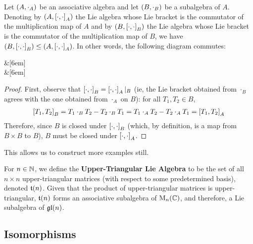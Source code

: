 \begin{boxproposition}\label{Ch1:Prop:Subalg_Commbracket}
    Let $\left( A, \cdot_A \right)$ be an associative algebra and let $\left( B, \cdot_B \right)$ be a subalgebra of $A$. Denoting by $\left( A, \left[ \cdot, \cdot \right]_A \right)$ the Lie algebra whose Lie bracket is the commutator of the multiplication map of $A$ and by $\left( B, \left[ \cdot, \cdot \right]_B \right)$ the Lie algebra whose Lie bracket is the commutator of the multiplication map of $B$, we have $\left( B, \left[ \cdot, \cdot \right]_B \right) \leq \left( A, \left[ \cdot, \cdot \right]_A \right)$. In other words, the following diagram commutes:

    \begin{cd}
        \arrow[r] &[6em]
         \\[2em]
        \arrow[r]
         &[6em]
        \label{Ch1:cd:Subalg_Commbracket}
    \end{cd}
\end{boxproposition}
\begin{proof}
    First, observe that $\left[ \cdot, \cdot \right]_B = \left[ \cdot, \cdot \right]_A\vert_B$ (ie, the Lie bracket obtained from $\cdot_B$ agrees with the one obtained from $\cdot_A$ on $B$): for all $T_1, T_2 \in B$,
    \begin{align*}
        \left[ T_1, T_2 \right]_B = T_1 \cdot_B T_2 - T_2 \cdot_B T_1 = T_1 \cdot_A T_2 - T_2 \cdot_A T_1 = \left[ T_1, T_2 \right]_A
    \end{align*}
    Therefore, since $B$ is closed under $\left[ \cdot, \cdot \right]_B$ (which, by definition, is a map from $B \times B$ to $B$), $B$ must be closed under $\left[ \cdot, \cdot \right]_A$.
\end{proof}

This allows us to construct more examples still.

\begin{boxexample}
    For $n \in \mathbb{N}$, we define the \textbf{Upper-Triangular Lie Algebra} to be the set of all $n \times n$ upper-triangular matrices (with respect to some predetermined basis), denoted $\mathfrak{t}\!\left( n \right)$. Given that the product of upper-triangular matrices is upper-triangular, $\mathfrak{t}\!\left( n \right)$ forms an associative subalgebra of $\operatorname{M}_{n}\!\left( \mathbb{C} \right)$, and therefore, a Lie subalgebra of $\mathfrak{gl}\!\left( n \right)$.
\end{boxexample}

\subsection{Isomorphisms}

